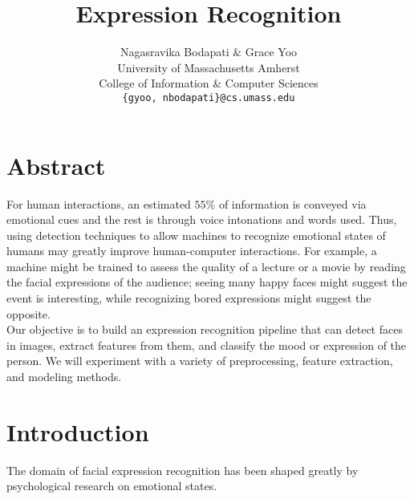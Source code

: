 \documentclass[10pt,twocolumn,letterpaper]{article}
\begin{document}
\title{Expression Recognition}

\author{Nagasravika Bodapati \& Grace Yoo \\ 
University of Massachusetts Amherst \\ 
College of Information \& Computer Sciences \\
{\tt\small \{gyoo, nbodapati\}@cs.umass.edu} \\
}

\maketitle

\section{Abstract} 
For human interactions, an estimated $55\%$ of information is conveyed via emotional cues and the rest is through voice intonations and words used. Thus, using detection techniques to allow machines to recognize emotional states of humans may greatly improve human-computer interactions. For example, a machine might be trained to assess the quality of a lecture or a movie by reading the facial expressions of the audience; seeing many happy faces might suggest the event is interesting, while recognizing bored expressions might suggest the opposite.  \\

\noindent Our objective is to build an expression recognition pipeline that can detect faces in images, extract features from them, and classify the mood or expression of the person. We will experiment with a variety of preprocessing, feature extraction, and modeling methods.

\section{Introduction}

The domain of facial expression recognition has been shaped greatly by psychological research on emotional states. 
\end{document}
